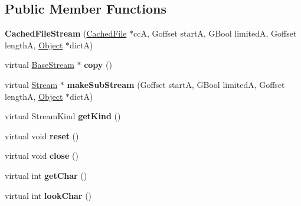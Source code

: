 \subsection*{Public Member Functions}
\begin{DoxyCompactItemize}
\item 
\mbox{\label{class_cached_file_stream_a885e92b373fc6b711274bb5767de3f99}} 
{\bfseries Cached\+File\+Stream} (\hyperlink{class_cached_file}{Cached\+File} $\ast$ccA, Goffset startA, G\+Bool limitedA, Goffset lengthA, \hyperlink{class_object}{Object} $\ast$dictA)
\item 
\mbox{\label{class_cached_file_stream_a0fffd56be3d68902ef1fd3da29972ba4}} 
virtual \hyperlink{class_base_stream}{Base\+Stream} $\ast$ {\bfseries copy} ()
\item 
\mbox{\label{class_cached_file_stream_a765f3d6486063cba4f0986ad972b11c2}} 
virtual \hyperlink{class_stream}{Stream} $\ast$ {\bfseries make\+Sub\+Stream} (Goffset startA, G\+Bool limitedA, Goffset lengthA, \hyperlink{class_object}{Object} $\ast$dictA)
\item 
\mbox{\label{class_cached_file_stream_a5d2a58b5bda1ec8253e346d396dd7195}} 
virtual Stream\+Kind {\bfseries get\+Kind} ()
\item 
\mbox{\label{class_cached_file_stream_acc541e6d30a17cec14ce05ead68c05b7}} 
virtual void {\bfseries reset} ()
\item 
\mbox{\label{class_cached_file_stream_acc3bb8a80feeddff277405240d40a0af}} 
virtual void {\bfseries close} ()
\item 
\mbox{\label{class_cached_file_stream_a2d697b73cc5dab8430aa267b07f35375}} 
virtual int {\bfseries get\+Char} ()
\item 
\mbox{\label{class_cached_file_stream_aa7321ab50d421883b8dec9a6e4b28ec2}} 
virtual int {\bfseries look\+Char} ()
\item 
\mbox{\label{class_cached_file_stream_a838cae390fa69bb6ce79e35b6a3de672}} 

\end{DoxyCompactItemize}

